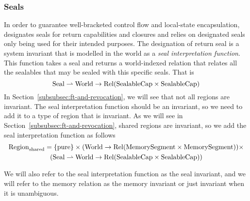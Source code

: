 \begin{jversion}
\subsubsection{Seals}
\label{subsubsec:seals}
In order to guarantee well-bracketed control flow and local-state encapsulation, \stktokens{} designates seals for return capabilities and closures and relies on designated seals only being used for their intended purposes.
The designation of return seal is a system invariant that is modelled in the world as a \textit{seal interpretation function}.
This function takes a seal and returns a world-indexed relation that relates all the sealables that may be sealed with this specific seals.
That is
\[
  \mathrm{Seal} \rightharpoonup \mathrm{World} \rightarrow \mathrm{Rel}(\mathrm{SealableCap} \times \mathrm{SealableCap})
\]
In Section~\ref{subsubsec:ft-and-revocation}, we will see that not all regions are invariant.
The seal interpretation function should be an invariant, so we need to add it to a type of region that is invariant.
As we will see in Section~\ref{subsubsec:ft-and-revocation}, shared regions are invariant, so we add the seal interpretation function as follows
\begin{multline*}
  \mathrm{Region}_\mathrm{shared} = 
  \{\mathrm{pure} \} \times (\mathrm{World} \rightarrow \mathrm{Rel}(\mathrm{MemorySegment}\times\mathrm{MemorySegment})) \times \\
  (\mathrm{Seal} \rightharpoonup \mathrm{World} \rightarrow \mathrm{Rel}(\mathrm{SealableCap} \times \mathrm{SealableCap}))
\end{multline*}

We will also refer to the seal interpretation function as the seal invariant, and we will refer to the memory relation as the memory invariant or just invariant when it is unambiguous.



\end{jversion}
